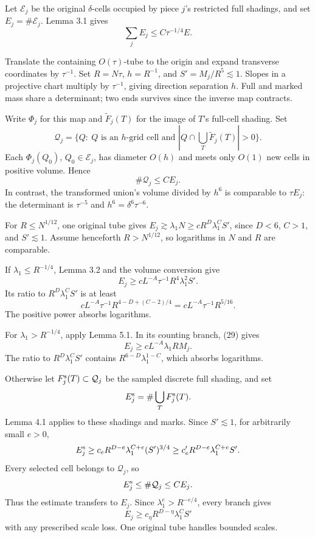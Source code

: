 \documentclass[
  11pt,
  a4paper,
]{article}
\begin{document}
Let \(\mathcal E_j\) be the original \(\delta\)-cells occupied by piece
\(j\)'s restricted full shadings, and set \(E_j=\#\mathcal E_j\). Lemma
3.1 gives \[
 \sum_jE_j\le C\tau^{-1/4}E.
\tag{28}\label{eq:28}
\]

Translate the containing \(O(\tau)\)-tube to the origin and expand
transverse coordinates by \(\tau^{-1}\). Set \(R=N\tau\), \(h=R^{-1}\),
and \(S'=M_j/R^5\lesssim1\). Slopes in a projective chart multiply by
\(\tau^{-1}\), giving direction separation \(h\). Full and marked mass
share a determinant; two ends survives since the inverse map contracts.

Write \(\Phi_j\) for this map and \(\widetilde F_j(T)\) for the image of
\(T\)'s full-cell shading. Set \[
 \mathcal Q_j=\bigl\{Q:\ Q\text{ is an }h\text{-grid cell and }
 |Q\cap\textstyle\bigcup_T\widetilde F_j(T)|>0\bigr\}.
\] Each \(\Phi_j(Q_0)\), \(Q_0\in\mathcal E_j\), has diameter \(O(h)\)
and meets only \(O(1)\) new cells in positive volume. Hence \[
 \#\mathcal Q_j\le CE_j.
\tag{29}\label{eq:29}
\] In contrast, the transformed union's volume divided by \(h^6\) is
comparable to \(\tau E_j\): the determinant is \(\tau^{-5}\) and
\(h^6=\delta^6\tau^{-6}\).

For \(R\le N^{1/12}\), one original tube gives
\(E_j\gtrsim\lambda_1N\ge cR^D\lambda_1^CS'\), since \(D<6\), \(C>1\),
and \(S'\lesssim1\). Assume henceforth \(R>N^{1/12}\), so logarithms in
\(N\) and \(R\) are comparable.

If \(\lambda_1\le R^{-1/4}\), Lemma 3.2 and the volume conversion give
\[
 E_j\ge cL^{-A}\tau^{-1}R^4\lambda_1^2S'.
\] Its ratio to \(R^D\lambda_1^CS'\) is at least \[
 cL^{-A}\tau^{-1}R^{4-D+(C-2)/4}
 =cL^{-A}\tau^{-1}R^{5/16}.
\] The positive power absorbs logarithms.

For \(\lambda_1>R^{-1/4}\), apply Lemma 5.1. In its counting branch,
(29) gives \[
 E_j\ge cL^{-A}\lambda_1RM_j.
\] The ratio to \(R^D\lambda_1^CS'\) contains
\(R^{6-D}\lambda_1^{1-C}\), which absorbs logarithms.

Otherwise let \(F_j^{\rm s}(T)\subset\mathcal Q_j\) be the sampled
discrete full shading, and set \[
 E_j^{\rm s}=\#\bigcup_T F_j^{\rm s}(T).
\] Lemma 4.1 applies to these shadings and marks. Since \(S'\lesssim1\),
for arbitrarily small \(e>0\), \[
 E_j^{\rm s}\ge c_eR^{D-e}\lambda_1^{C+e}(S')^{3/4}
 \ge c'_eR^{D-e}\lambda_1^{C+e}S'.
\] Every selected cell belongs to \(\mathcal Q_j\), so \[
 E_j^{\rm s}\le\#\mathcal Q_j\le CE_j.
\] Thus the estimate transfers to \(E_j\). Since
\(\lambda_1^e>R^{-e/4}\), every branch gives \[
 E_j\ge c_\eta R^{D-\eta}\lambda_1^CS'
\tag{30}\label{eq:30}
\] with any prescribed scale loss. One original tube handles bounded
scales.
\end{document}
